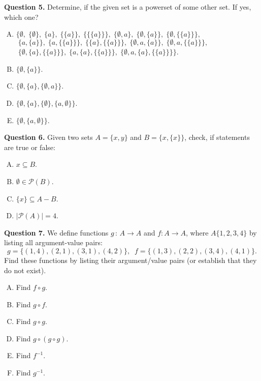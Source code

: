 \documentclass[jou]{apa6}
\begin{document}
\vspace{6pt}
{\bf Question 5.}
Determine, if the given set is a powerset of some other set. If yes, which one?
\begin{enumerate}[(A)]
\item $\{\emptyset,\; \{\emptyset\},\; \{a\},\; \{\{a\}\},\; \{\{\{a\}\}\},\; \{\emptyset, a\},\; \{\emptyset, \{a\}\},\; \{\emptyset, \{\{a\}\}\},$\\
\mbox{}$\;\{a, \{a\}\},\; \{a, \{\{a\}\}\},\; \{\{a\}, \{\{a\}\}\},\; \{\emptyset, a, \{a\}\},\; \{\emptyset, a, \{\{a\}\}\},$\\
\mbox{}$\;\{\emptyset, \{a\}, \{\{a\}\}\},\; \{a, \{a\}, \{\{a\}\}\},\; \{\emptyset, a, \{a\}, \{\{a\}\}\}\}$.
\item $\{\emptyset, \{a\}\}$.
\item $\{\emptyset, \{a\}, \{\emptyset, a\}\}$.
\item $\{\emptyset, \{a\}, \{\emptyset\}, \{a, \emptyset\}\}$.
\item $\{\emptyset, \{a, \emptyset\}\}$.
\end{enumerate}

\vspace{6pt}
{\bf Question 6.}
Given two sets $A = \{ x, y \}$ and $B = \{x, \{x \}\}$, check, if statements are true or false:
\begin{enumerate}[(A)]
\item $x \subseteq B$.
\item $\emptyset \in \mathcal{P}(B)$.
\item $\{x\} \subseteq A - B$.
\item $|\mathcal{P}(A)| = 4$.
\end{enumerate}


\vspace{6pt}
{\bf Question 7.}
We define functions $g\,:\, A \rightarrow A$ and $f : A \rightarrow A$, where $A \{1, 2, 3, 4\}$ by 
listing all argument-value pairs: 
$$g = \{(1, 4), (2, 1), (3, 1), (4, 2)\},\;\;f = \{(1, 3), (2, 2), (3, 4), (4, 1)\}.$$
Find these functions by listing their argument/value pairs (or establish that they do not exist).
\begin{enumerate}[(A)]
\item Find $f \circ g$.
\item Find $g \circ f$.
\item Find $g \circ g$.
\item Find $g \circ (g \circ g)$.
\item Find $f^{-1}$.
\item Find $g^{-1}$.
\end{enumerate}
\end{document}

